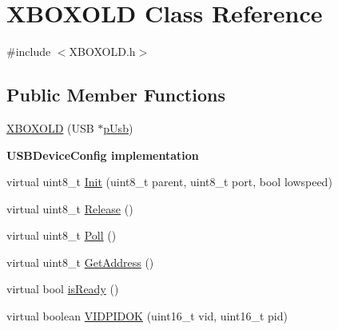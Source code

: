 \hypertarget{class_x_b_o_x_o_l_d}{\section{\-X\-B\-O\-X\-O\-L\-D \-Class \-Reference}
\label{class_x_b_o_x_o_l_d}
}


{\ttfamily \#include $<$\-X\-B\-O\-X\-O\-L\-D.\-h$>$}

\subsection*{\-Public \-Member \-Functions}
\begin{DoxyCompactItemize}
\item 
\hyperlink{class_x_b_o_x_o_l_d_a119c511d09ecc777437584a86858d86f}{\-X\-B\-O\-X\-O\-L\-D} (\-U\-S\-B $\ast$\hyperlink{class_x_b_o_x_o_l_d_a2b4d7d994ab6f5e1d1344d4162e9f5fb}{p\-Usb})
\end{DoxyCompactItemize}
\begin{Indent}{\bf \-U\-S\-B\-Device\-Config implementation}\par
\begin{DoxyCompactItemize}
\item 
virtual uint8\-\_\-t \hyperlink{class_x_b_o_x_o_l_d_a7260253c704b147e6dfd762e13222434}{\-Init} (uint8\-\_\-t parent, uint8\-\_\-t port, bool lowspeed)
\item 
virtual uint8\-\_\-t \hyperlink{class_x_b_o_x_o_l_d_a8245e0d30eed5fb7dc761fc350fd1765}{\-Release} ()
\item 
virtual uint8\-\_\-t \hyperlink{class_x_b_o_x_o_l_d_a332bf499dd0434d70db8ad8a6f3f4850}{\-Poll} ()
\item 
virtual uint8\-\_\-t \hyperlink{class_x_b_o_x_o_l_d_ac2db53abfe0aae15d56ef65b57a2b38a}{\-Get\-Address} ()
\item 
virtual bool \hyperlink{class_x_b_o_x_o_l_d_af4d77a5108f2e6812ba00be1b0374829}{is\-Ready} ()
\item 
virtual boolean \hyperlink{class_x_b_o_x_o_l_d_a20c8b928ca5e7c1a758a605ec45fe2ee}{\-V\-I\-D\-P\-I\-D\-O\-K} (uint16\-\_\-t vid, uint16\-\_\-t pid)
\end{DoxyCompactItemize}
\end{Indent}

